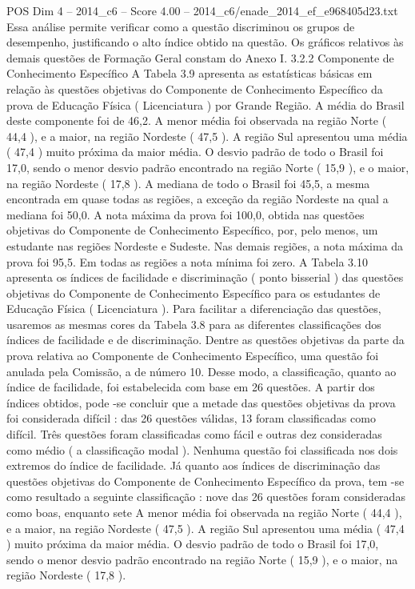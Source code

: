 \begin{textsample}{POS Dim 4 – 2014\_c6 – Score 4.00 – 2014\_c6/enade\_2014\_ef\_e968405d23.txt}
Essa análise permite verificar como a questão discriminou os grupos de desempenho, justificando o alto índice obtido na questão.
Os gráficos relativos às demais questões de Formação Geral constam do Anexo I. 3.2.2 Componente de Conhecimento Específico A Tabela 3.9 apresenta as estatísticas básicas em relação às questões objetivas do Componente de Conhecimento Específico da prova de Educação Física ( Licenciatura ) por Grande Região.
A média do Brasil deste componente foi de 46,2.
A menor média foi observada na região Norte ( 44,4 ), e a maior, na região Nordeste ( 47,5 ).
A região Sul apresentou uma média ( 47,4 ) muito próxima da maior média.
O desvio padrão de todo o Brasil foi 17,0, sendo o menor desvio padrão encontrado na região Norte ( 15,9 ), e o maior, na região Nordeste ( 17,8 ).
A mediana de todo o Brasil foi 45,5, a mesma encontrada em quase todas as regiões, a exceção da região Nordeste na qual a mediana foi 50,0.
A nota máxima da prova foi 100,0, obtida nas questões objetivas do Componente de Conhecimento Específico, por, pelo menos, um estudante nas regiões Nordeste e Sudeste.
Nas demais regiões, a nota máxima da prova foi 95,5.
Em todas as regiões a nota mínima foi zero.
A Tabela 3.10 apresenta os índices de facilidade e discriminação ( ponto bisserial ) das questões objetivas do Componente de Conhecimento Específico para os estudantes de Educação Física ( Licenciatura ).
Para facilitar a diferenciação das questões, usaremos as mesmas cores da Tabela 3.8 para as diferentes classificações dos índices de facilidade e de discriminação.
Dentre as questões objetivas da parte da prova relativa ao Componente de Conhecimento Específico, uma questão foi anulada pela Comissão, a de número 10.
Desse modo, a classificação, quanto ao índice de facilidade, foi estabelecida com base em 26 questões.
A partir dos índices obtidos, pode -se concluir que a metade das questões objetivas da prova foi considerada difícil : das 26 questões válidas, 13 foram classificadas como difícil.
Três questões foram classificadas como fácil e outras dez consideradas como médio ( a classificação modal ).
Nenhuma questão foi classificada nos dois extremos do índice de facilidade.
Já quanto aos índices de discriminação das questões objetivas do Componente de Conhecimento Específico da prova, tem -se como resultado a seguinte classificação : nove das 26 questões foram consideradas como boas, enquanto sete A menor média foi observada na região Norte ( 44,4 ), e a maior, na região Nordeste ( 47,5 ).
A região Sul apresentou uma média ( 47,4 ) muito próxima da maior média.
O desvio padrão de todo o Brasil foi 17,0, sendo o menor desvio padrão encontrado na região Norte ( 15,9 ), e o maior, na região Nordeste ( 17,8 ).

\end{textsample}
